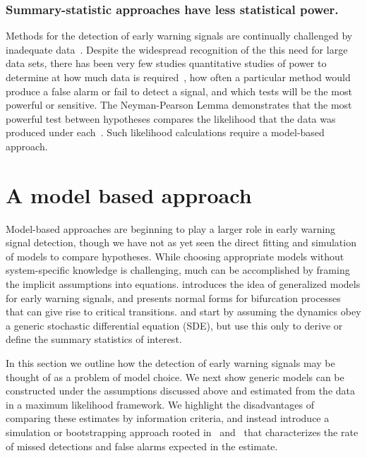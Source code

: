\documentclass[authoryear,review,11pt]{elsarticle}
\begin{document}
\subsubsection*{Summary-statistic approaches have less statistical power.}
Methods for the detection of early warning signals are continually challenged by inadequate data~\citep{Inman2011, Scheffer2010,Held2004, Dakos2008, Scheffer2009, Guttal2008, Carpenter2011, Bestelmeyer2011}.
Despite the widespread recognition of the this need for large data sets,
there has been very few studies quantitative studies of power to determine at how much data is required~\citep{Contamin2009},
how often a particular method would produce a false alarm or fail to detect a signal,
and which tests will be the most powerful or sensitive.
The Neyman-Pearson Lemma demonstrates that the most powerful test between hypotheses
compares the likelihood that the data was produced under each~\citep{Neyman1933}.
Such likelihood calculations require a model-based approach.


\section{A model based approach}
Model-based approaches are beginning to play a larger role in early warning signal detection,
though we have not as yet seen the direct fitting and simulation of models to compare hypotheses.
While choosing appropriate models without system-specific knowledge is challenging,
much can be accomplished by framing the implicit assumptions into equations.
\citet{Lade2012} introduces the idea of generalized models for early warning signals, and
\citet{Kuehn2011} presents normal forms for bifurcation processes that can give rise to critical transitions.
\citet{Carpenter2011e} and \citet{Dakos2011a} start by assuming the dynamics obey a generic
stochastic differential equation (SDE), but use this only to derive or define the summary statistics of interest.

In this section we outline how the detection of early warning signals may be thought of
as a problem of model choice.
We next show generic models can be constructed under the assumptions discussed above
and estimated from the data in a maximum likelihood framework.
We highlight the disadvantages of comparing these estimates by information criteria,
and instead introduce a simulation or bootstrapping approach rooted in~\citet{Cox1961} and~\citet{McLachlan1987} that
characterizes the rate of missed detections and false alarms expected in the estimate.
\end{document}
